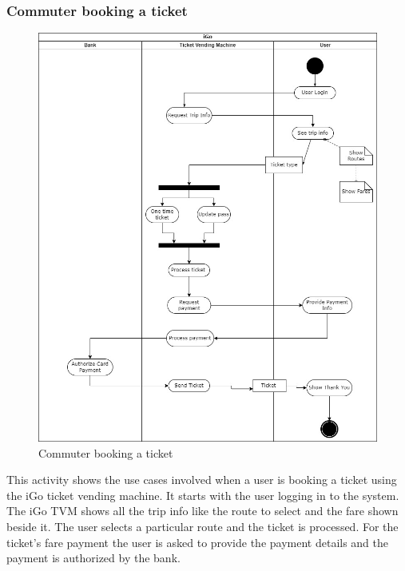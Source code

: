 \documentclass{article}
\begin{document}
 \subsubsection{Commuter booking a ticket}
     \begin{figure}[h]
        \centering
        \includegraphics[scale=0.3]{booking_ticket.jpg}
        \caption{Commuter booking a ticket}
        \label{fig:booking}
    \end{figure}
    This activity shows the use cases involved when a user is booking a ticket using the iGo ticket vending machine. It starts with the user logging in to the system. The iGo TVM shows all the trip info like the route to select and the fare shown beside it. The user selects a particular route and the ticket is processed. For the ticket's fare payment the user is asked to provide the payment details and the payment is authorized by the bank. 
    \pagebreak
\end{document}
